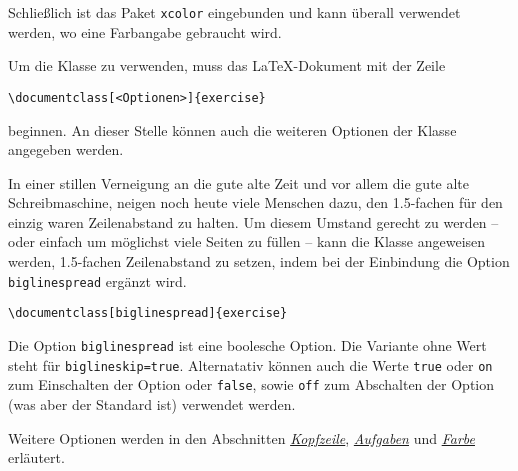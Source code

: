 \documentclass{exercise}
\begin{document}
    Schließlich ist das Paket \texttt{xcolor} \cite{xcolor} eingebunden und kann
    überall verwendet werden, wo eine Farbangabe gebraucht wird.
    
    Um die Klasse zu verwenden, muss das \LaTeX{}-Dokument mit der Zeile
    \begin{lstlisting}[gobble=6]
      \documentclass[<Optionen>]{exercise}
    \end{lstlisting} 
    beginnen. An dieser Stelle können auch die weiteren Optionen der Klasse
    angegeben werden.
    
    In einer stillen Verneigung an die gute alte Zeit und vor allem die gute
    alte Schreibmaschine, neigen noch heute viele Menschen dazu, den 1.5-fachen
    für den einzig waren Zeilenabstand zu halten. Um diesem Umstand gerecht zu
    werden -- oder einfach um möglichst viele Seiten zu füllen -- kann die
    Klasse angeweisen werden, 1.5-fachen Zeilenabstand zu setzen, indem bei
    der Einbindung die Option \lstinline{biglinespread} ergänzt wird.
    \begin{lstlisting}[gobble=6]
      \documentclass[biglinespread]{exercise}
    \end{lstlisting}
    
    Die Option \lstinline{biglinespread} ist eine boolesche Option. Die Variante
    ohne Wert steht für \lstinline{biglineskip=true}. Alternatativ können auch die
    Werte \lstinline{true} oder \lstinline{on} zum Einschalten der Option oder
    \lstinline{false}, sowie \lstinline{off} zum Abschalten der Option (was aber der
    Standard ist) verwendet werden.
    
    Weitere Optionen werden in den Abschnitten
    \emph{\hyperref[section-kopfzeile]{Kopfzeile}},
    \emph{\hyperref[section-aufgaben]{Aufgaben}} und
    \emph{\hyperref[section-farbe]{Farbe}} erläutert.
    
\end{document}
